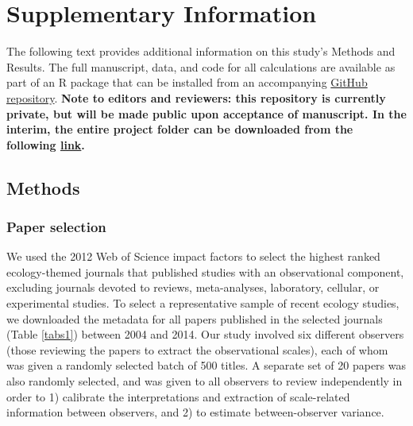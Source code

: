 \documentclass[12pt]{article}
\newcommand{\beginsupplement}{%
        \setcounter{table}{0}
        \renewcommand{\thetable}{S\arabic{table}}%
        \setcounter{figure}{0}
        \renewcommand{\thefigure}{S\arabic{figure}}%
     }
\begin{document}
 
\beginsupplement

\linenumbers
\baselineskip24pt

\section*{Supplementary Information}%

The following text provides additional information on this study's Methods and Results.  The full manuscript, data, and code for all calculations are available as part of an R package that can be installed from an accompanying \href{https://github.com/agroimpacts/ecoscales}{GitHub repository}. \textbf{Note to editors and reviewers: this repository is currently private, but will be made public upon acceptance of manuscript. In the interim, the entire project folder can be downloaded from the following \href{https://www.dropbox.com/sh/1l9em6p0wyabwr3/AADhCpFvqjv6y7VbL5tgB3Iqa?dl=0}{link}.}

\subsection*{Methods}%
\vspace{-4pt}
\subsubsection*{Paper selection}
\vspace{-10pt}
We used the 2012 Web of Science impact factors to select the highest ranked ecology-themed journals that published studies with an observational component, excluding journals devoted to reviews, meta-analyses, laboratory, cellular, or experimental studies.  To select a representative sample of recent ecology studies, we downloaded the metadata for all papers published in the selected journals (Table \ref{tabs1}) between 2004 and 2014. Our study involved six different observers (those reviewing the papers to extract the observational scales), each of whom was given a randomly selected batch of 500 titles.  A separate set of 20 papers was also randomly selected, and was given to all observers to review independently in order to 1) calibrate the interpretations and extraction of scale-related information between observers, and 2) to estimate between-observer variance.  
\end{document}

